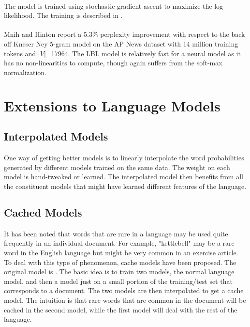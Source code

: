 \documentclass[12pt]{ociamthesis}
\begin{document}
\paragraph{}
The model is trained using stochastic gradient ascent to maximize the log likelihood. The training is described in \cite{MnihHinton2007}.
\paragraph{}
Mnih and Hinton report a 5.3\% perplexity improvement with respect to the back off Kneser Ney 5-gram model on the AP News dataset with 14 million training tokens and $|V|$=17964. The LBL model is relatively fast for a neural model as it has no non-linearities to compute, though again suffers from the soft-max normalization. 

\section {Extensions to Language Models}
\subsection{Interpolated Models}
\paragraph{}
One way of getting better models is to linearly interpolate the word probabilities generated by different models trained on the same data. The weight on each model is hand-tweaked or learned. The interpolated model then benefits from all the constituent models that might have learned different features of the language.
\subsection{Cached Models}
\paragraph{}
It has been noted that words that are rare in a language may be used quite frequently in an individual document. For example, "kettlebell" may be a rare word in the English language but might be very common in an exercise article. To deal with this type of phenomenon, cache models have been proposed. The original model is \cite{Kuhn1990}. The basic idea is to train two models, the normal language model, and then a model just on a small portion of the training/test set that corresponds to a document. The two models are then interpolated to get a cache model. The intuition is that rare words that are common in the document will be cached in the second model, while the first model will deal with the rest of the language.
\end{document}
